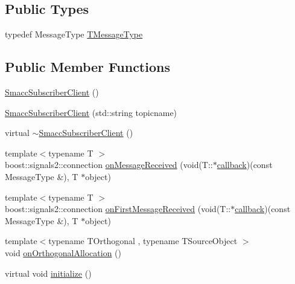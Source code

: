 \subsection*{Public Types}
\begin{DoxyCompactItemize}
\item 
typedef Message\+Type \hyperlink{classsmacc_1_1client__bases_1_1SmaccSubscriberClient_a61d798bda71bf335d72e61928ca561b0}{T\+Message\+Type}
\end{DoxyCompactItemize}
\subsection*{Public Member Functions}
\begin{DoxyCompactItemize}
\item 
\hyperlink{classsmacc_1_1client__bases_1_1SmaccSubscriberClient_a9c3dd9981beb495a0646667acae06d73}{Smacc\+Subscriber\+Client} ()
\item 
\hyperlink{classsmacc_1_1client__bases_1_1SmaccSubscriberClient_a7e739a204fe5fe5b8cd7542758555e45}{Smacc\+Subscriber\+Client} (std\+::string topicname)
\item 
virtual \hyperlink{classsmacc_1_1client__bases_1_1SmaccSubscriberClient_a91b9206c97b4acc76d4202639d24a53b}{$\sim$\+Smacc\+Subscriber\+Client} ()
\item 
{\footnotesize template$<$typename T $>$ }\\boost\+::signals2\+::connection \hyperlink{classsmacc_1_1client__bases_1_1SmaccSubscriberClient_a4f02251e3a161fb6d802b154b1081f18}{on\+Message\+Received} (void(T\+::$\ast$\hyperlink{sm__ridgeback__barrel__search__2_2servers_2opencv__perception__node_2opencv__perception__node_8cpp_a050e697bd654facce10ea3f6549669b3}{callback})(const Message\+Type \&), T $\ast$object)
\item 
{\footnotesize template$<$typename T $>$ }\\boost\+::signals2\+::connection \hyperlink{classsmacc_1_1client__bases_1_1SmaccSubscriberClient_a3f6dc8ef86f21f401204182778cc584d}{on\+First\+Message\+Received} (void(T\+::$\ast$\hyperlink{sm__ridgeback__barrel__search__2_2servers_2opencv__perception__node_2opencv__perception__node_8cpp_a050e697bd654facce10ea3f6549669b3}{callback})(const Message\+Type \&), T $\ast$object)
\item 
{\footnotesize template$<$typename T\+Orthogonal , typename T\+Source\+Object $>$ }\\void \hyperlink{classsmacc_1_1client__bases_1_1SmaccSubscriberClient_a8843bd148887523698b6d01dae740a97}{on\+Orthogonal\+Allocation} ()
\item 
virtual void \hyperlink{classsmacc_1_1client__bases_1_1SmaccSubscriberClient_af188f0f5e89de26a07e1f964cdd23a70}{initialize} ()
\end{DoxyCompactItemize}
